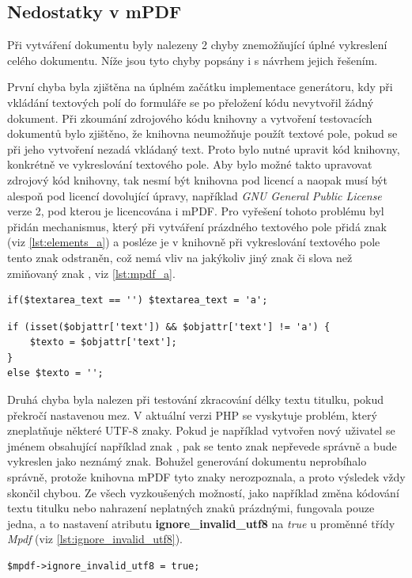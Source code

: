 \subsection{Nedostatky v mPDF}
Při vytváření dokumentu byly nalezeny 2 chyby znemožňující úplné vykreslení celého dokumentu. Níže jsou tyto chyby popsány i s návrhem jejich řešením.
\par
První chyba byla zjištěna na úplném začátku implementace generátoru, kdy při vkládání textových polí do formuláře se po přeložení kódu nevytvořil žádný dokument. Při zkoumání zdrojového kódu knihovny a vytvoření testovacích dokumentů bylo zjištěno, že knihovna neumožňuje použít textové pole, pokud se při jeho vytvoření nezadá vkládaný text. Proto bylo nutné upravit kód knihovny, konkrétně ve vykreslování textového pole. Aby bylo možné takto upravovat zdrojový kód knihovny, tak nesmí být knihovna pod licencí a naopak musí  být alespoň pod licencí dovolující úpravy, například \textit{GNU General Public License} verze 2, pod kterou je licencována i mPDF. Pro vyřešení tohoto problému byl přidán mechanismus, který při vytváření prázdného textového pole přidá znak  (viz \ref{lst:elements_a}) a posléze je v knihovně při vykreslování textového pole tento znak odstraněn, což nemá vliv na jakýkoliv jiný znak či slova než zmiňovaný znak , viz \ref{lst:mpdf_a}.
\begin{lstlisting}[caption = {Dočasné přiřazení znaku \uv{\textbf{a}} do textového pole (HTMLElements.php)}, label = {lst:elements_a}, captionpos=b]
if($textarea_text == '') $textarea_text = 'a';
\end{lstlisting}
\begin{lstlisting}[caption = {Odstranění znaku \uv{\textbf{a}} z textového pole (Mpdf.php)}, label = {lst:mpdf_a}, captionpos=b]
if (isset($objattr['text']) && $objattr['text'] != 'a') {
	$texto = $objattr['text'];
}
else $texto = '';
\end{lstlisting}
\par
Druhá chyba byla nalezen při testování zkracování délky textu titulku, pokud překročí nastavenou mez. V aktuální verzi PHP se vyskytuje problém, který zneplatňuje některé UTF-8 znaky. Pokud je například vytvořen nový uživatel se jménem obsahující například znak , pak se tento znak nepřevede správně a bude vykreslen jako neznámý znak. Bohužel generování dokumentu neprobíhalo správně, protože knihovna mPDF tyto znaky nerozpoznala, a proto výsledek vždy skončil chybou. Ze všech vyzkoušených možností, jako například změna kódování textu titulku nebo nahrazení neplatných znaků prázdnými, fungovala pouze jedna, a to nastavení atributu \textbf{ignore\_invalid\_utf8} na \textit{true} u proměnné třídy \textit{Mpdf} (viz \ref{lst:ignore_invalid_utf8}).
\begin{lstlisting}[caption = {Nastavení atributu \textbf{ignore\_invalid\_utf8} (orlib.php)}, label = {lst:ignore_invalid_utf8}, captionpos=b]
$mpdf->ignore_invalid_utf8 = true;
\end{lstlisting}

